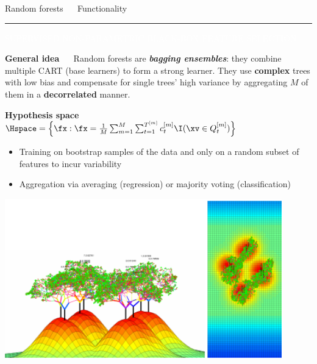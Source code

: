 \documentclass[11pt,compress,t,notes=noshow, xcolor=table]{beamer}
\begin{document}
\LARGE
\begin{frame}{\textcolor{gray!80}{Random forests} ~~ Functionality}
\normalsize
\vspace{-0.5cm}
\noindent \textcolor{gray!80}{\rule{\textwidth}{1pt}}

\vspace{0.3cm}

\footnotesize

\colorbox{gray!80}{\textcolor{white}{SUPERVISED}} 
\colorbox{gray!80}{\textcolor{white}{NON-PARAMETRIC}} 
\colorbox{gray!80}{\textcolor{white}{BLACK-BOX}} 
\colorbox{gray!80}{\textcolor{white}{FEATURE SELECTION}}

\medskip

\textbf{\textcolor{gray!80}{General idea}} ~~ Random forests are 
\textit{\textbf{bagging ensembles}}: they combine multiple CART (base learners)
to form a strong learner. They use \textbf{complex} trees with low  bias and 
compensate for single trees' high variance by aggregating $M$ of them in a 
\textbf{decorrelated} manner. 

\medskip

\textbf{\textcolor{gray!80}{Hypothesis space}} ~~
$\Hspace = \left\{ \fx: \fx = \frac{1}{M} \sum_{m = 1}^M \sum_{t = 1}^{T^{[m]}} 
c_t^{[m]} \I(\xv \in Q_t^{[m]}) \right\}$

\medskip

\begin{minipage}{0.6\textwidth}
  \begin{itemize}
    \item Training on bootstrap samples of the data and only on a random subset 
    of features to incur variability
    \item Aggregation via averaging (regression) or majority voting
    (classification)
  \end{itemize}
\end{minipage}%
\begin{minipage}{0.4\textwidth}
  \includegraphics[width=0.9\textwidth]{figure/rf_3d.PNG}
\end{minipage}

\end{frame}
\end{document}
